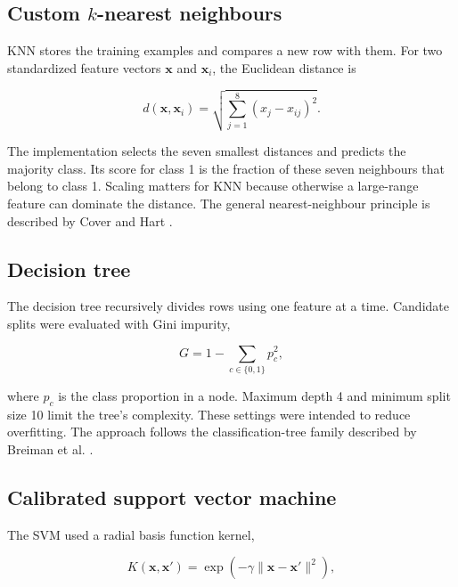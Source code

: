 \documentclass[pdflatex,sn-vancouver-num]{sn-jnl}
\begin{document}
\subsection{Custom \texorpdfstring{$k$}{k}-nearest neighbours}\label{subsec:knn}

KNN stores the training examples and compares a new row with them. For two standardized feature vectors $\mathbf{x}$ and $\mathbf{x}_i$, the Euclidean distance is

\begin{equation}
d(\mathbf{x},\mathbf{x}_i)=\sqrt{\sum_{j=1}^{8}(x_j-x_{ij})^2}.
\label{eq:distance}
\end{equation}

The implementation selects the seven smallest distances and predicts the majority class. Its score for class 1 is the fraction of these seven neighbours that belong to class 1. Scaling matters for KNN because otherwise a large-range feature can dominate the distance. The general nearest-neighbour principle is described by Cover and Hart \cite{cover1967nearest}.

\subsection{Decision tree}\label{subsec:tree}

The decision tree recursively divides rows using one feature at a time. Candidate splits were evaluated with Gini impurity,

\begin{equation}
G = 1-\sum_{c\in\{0,1\}}p_c^2,
\label{eq:gini}
\end{equation}

where $p_c$ is the class proportion in a node. Maximum depth 4 and minimum split size 10 limit the tree's complexity. These settings were intended to reduce overfitting. The approach follows the classification-tree family described by Breiman et al. \cite{breiman1984cart}.

\subsection{Calibrated support vector machine}\label{subsec:svm}

The SVM used a radial basis function kernel,

\begin{equation}
K(\mathbf{x},\mathbf{x}')=\exp\left(-\gamma\lVert\mathbf{x}-\mathbf{x}'\rVert^2\right),
\label{eq:rbf}
\end{equation}
\end{document}
